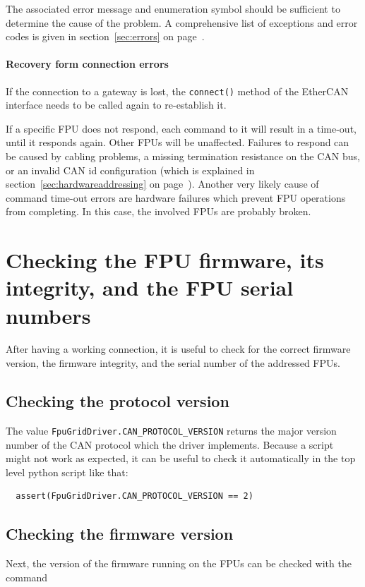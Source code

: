 \documentclass[fontsize=12,a4paper]{scrreprt}
\begin{document}
The associated error message and enumeration symbol should be
sufficient to determine the cause of the problem. A comprehensive list
of exceptions and error codes is given in section~\ref{sec:errors} on
page~\pageref{sec:errors}.

\paragraph{Recovery form connection errors}
If the connection to a gateway is lost, the \texttt{connect()} method
of the EtherCAN interface needs to be called again to re-establish it.

%
%
%
If a specific FPU does not respond, each command to it will result in
a time-out, until it responds again. Other FPUs will be unaffected.
Failures to respond can be caused by cabling problems, a missing
termination resistance on the CAN bus, or an invalid CAN id
configuration (which is explained in
section~\ref{sec:hardwareaddressing} on
page~\pageref{sec:hardwareaddressing}). Another very likely cause of
command time-out errors are hardware failures which prevent FPU
operations from completing. In this case, the involved FPUs are
probably broken.


\section{Checking the FPU firmware, its integrity, and the FPU serial numbers}

After having a working connection, it is useful to check for the
correct firmware version, the firmware integrity, and the serial
number of the addressed FPUs.

\subsection{Checking the protocol version}
%
%
The value \texttt{FpuGridDriver.CAN\_PROTOCOL\_VERSION}
returns the major version number of the CAN protocol
which the driver implements. Because a script might
not work as expected, it can be useful to check it
automatically in the top level python script like that:

\begin{verbatim}
  assert(FpuGridDriver.CAN_PROTOCOL_VERSION == 2)
\end{verbatim}


\subsection{Checking the firmware version}
%
%
Next, the version of the firmware running on the FPUs can be checked
with the command
\end{document}
